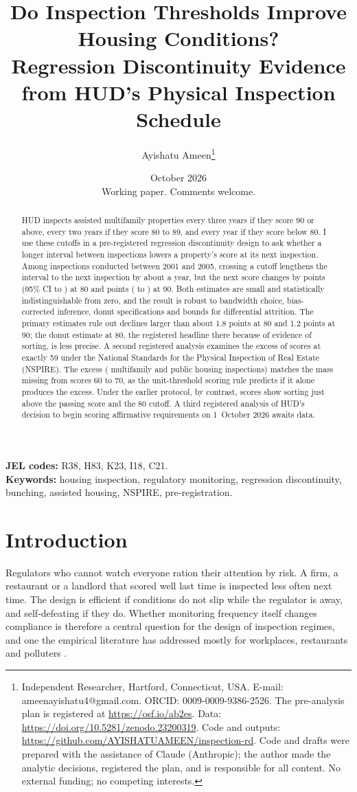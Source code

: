 \documentclass[11pt,letterpaper]{article}
\title{Do Inspection Thresholds Improve Housing Conditions?\\[0.3ex]\large Regression Discontinuity Evidence from HUD's Physical Inspection Schedule}
\author{Ayishatu Ameen\thanks{Independent Researcher, Hartford, Connecticut, USA. E-mail: ameenayishatu4@gmail.com. ORCID: 0009-0009-9386-2526. The pre-analysis plan is registered at \url{https://osf.io/ab2es}. Data: \url{https://doi.org/10.5281/zenodo.23200319}. Code and outputs: \url{https://github.com/AYISHATUAMEEN/inspection-rd}. Code and drafts were prepared with the assistance of Claude (Anthropic); the author made the analytic decisions, registered the plan, and is responsible for all content. No external funding; no competing interests.}}
\date{October 2026\\[0.5ex]\small Working paper. Comments welcome.}
\begin{document}
\maketitle
\begin{abstract}
\noindent HUD inspects assisted multifamily properties every three years if they score 90 or above, every two years if they score 80 to 89, and every year if they score below 80. I use these cutoffs in a pre-registered regression discontinuity design to ask whether a longer interval between inspections lowers a property's score at its next inspection. Among \nIndex{} inspections conducted between 2001 and 2005, crossing a cutoff lengthens the interval to the next inspection by about a year, but the next score changes by \jumpEighty{} points (95\% CI \ciLoEighty{} to \ciHiEighty) at 80 and \jumpNinety{} points (\ciLoNinety{} to \ciHiNinety) at 90. Both estimates are small and statistically indistinguishable from zero, and the result is robust to bandwidth choice, bias-corrected inference, donut specifications and bounds for differential attrition. The primary estimates rule out declines larger than about 1.8 points at 80 and 1.2 points at 90; the donut estimate at 80, the registered headline there because of evidence of sorting, is less precise. A second registered analysis examines the excess of scores at exactly 59 under the National Standards for the Physical Inspection of Real Estate (NSPIRE). The excess (\excMf{} multifamily and \excPh{} public housing inspections) matches the mass missing from scores 60 to 70, as the unit-threshold scoring rule predicts if it alone produces the excess. Under the earlier protocol, by contrast, scores show sorting just above the passing score and the 80 cutoff. A third registered analysis of HUD's decision to begin scoring affirmative requirements on 1~October 2026 awaits data.
\end{abstract}

\noindent\textbf{JEL codes:} R38, H83, K23, I18, C21.\\
\textbf{Keywords:} housing inspection, regulatory monitoring, regression discontinuity, bunching, assisted housing, NSPIRE, pre-registration.

\section{Introduction}
Regulators who cannot watch everyone ration their attention by risk. A firm, a restaurant or a landlord that scored well last time is inspected less often next time. The design is efficient if conditions do not slip while the regulator is away, and self-defeating if they do. Whether monitoring frequency itself changes compliance is therefore a central question for the design of inspection regimes, and one the empirical literature has addressed mostly for workplaces, restaurants and polluters \citep{jin2003, levine2012, duflo2013, gray2011}.
\end{document}
